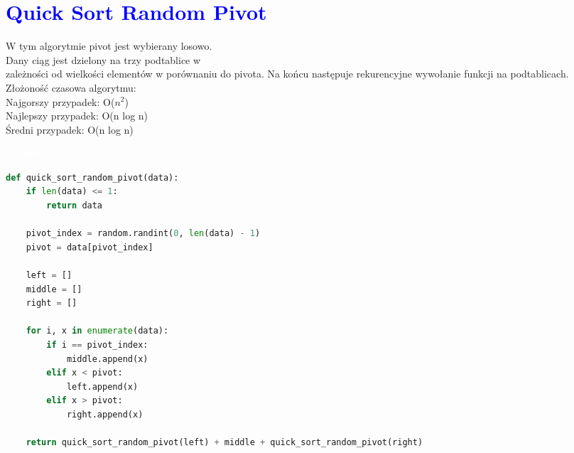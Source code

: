 \documentclass{article}
\begin{document}
	\section*{\textcolor{blue}{Quick Sort Random Pivot}}
	\begin{multicols}{2}
		\noindent W tym algorytmie pivot jest wybierany losowo. \\Dany ciąg jest dzielony na trzy podtablice w \\zależności od wielkości elementów w porównaniu do pivota. Na końcu następuje rekurencyjne wywołanie funkcji na podtablicach.
		\\Złożoność czasowa algorytmu: \\ Najgorszy przypadek: O($n^2$) \\Najlepszy przypadek: O(n log n) \\ Średni przypadek: O(n log n)
		
		\noindent 
		\begin{tcolorbox}[colback=black,colframe=gray!50!,arc=3mm,boxrule=0pt,left=0pt,right=0pt,width=\linewidth]
			\textcolor{white}{\textbf{\textsf{Terminal}}}\\
			
			\begin{lstlisting}[language=Python]
def quick_sort_random_pivot(data):
	if len(data) <= 1:
		return data

	pivot_index = random.randint(0, len(data) - 1)
	pivot = data[pivot_index]

	left = []
	middle = []
	right = []

	for i, x in enumerate(data):
		if i == pivot_index:
			middle.append(x)
		elif x < pivot:
			left.append(x)
		elif x > pivot:
			right.append(x)

	return quick_sort_random_pivot(left) + middle + quick_sort_random_pivot(right)

			\end{lstlisting}
			
		\end{tcolorbox}
	\end{multicols}
	
	\newpage
	
	
\end{document}
